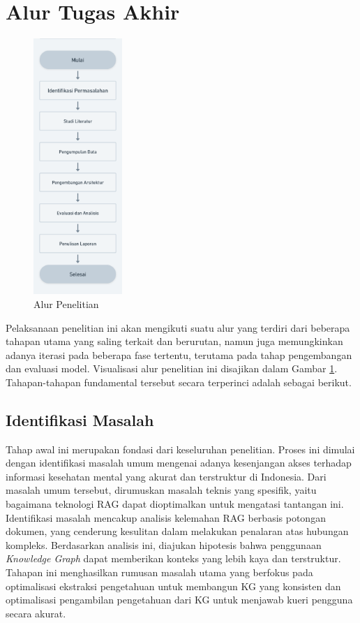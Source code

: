 \section{Alur Tugas Akhir}
\begin{figure}[H]
	\centering
	\includegraphics[width=0.3\textwidth]{images/alur-penelitian.png}
	\caption{Alur Penelitian}
	\label{fig:research-flow}
\end{figure}

Pelaksanaan penelitian ini akan mengikuti suatu alur yang terdiri dari beberapa tahapan utama yang saling terkait dan berurutan,
namun juga memungkinkan adanya iterasi pada beberapa fase tertentu, terutama pada tahap pengembangan dan evaluasi model.
Visualisasi alur penelitian ini disajikan dalam Gambar \ref{fig:research-flow}.
Tahapan-tahapan fundamental tersebut secara terperinci adalah sebagai berikut.


\subsection{Identifikasi Masalah}
Tahap awal ini merupakan fondasi dari keseluruhan penelitian. Proses ini dimulai dengan identifikasi masalah umum mengenai adanya kesenjangan akses terhadap informasi kesehatan mental yang akurat dan terstruktur di Indonesia.
Dari masalah umum tersebut, dirumuskan masalah teknis yang spesifik, yaitu bagaimana teknologi RAG dapat dioptimalkan untuk mengatasi tantangan ini.
Identifikasi masalah mencakup analisis kelemahan RAG berbasis potongan dokumen, yang cenderung kesulitan dalam melakukan penalaran atas hubungan kompleks.
Berdasarkan analisis ini, diajukan hipotesis bahwa penggunaan \textit{Knowledge Graph} dapat memberikan konteks yang lebih kaya dan terstruktur.
Tahapan ini menghasilkan rumusan masalah utama yang berfokus pada optimalisasi ekstraksi pengetahuan untuk membangun KG yang konsisten dan optimalisasi pengambilan pengetahuan dari KG untuk menjawab kueri pengguna secara akurat.

